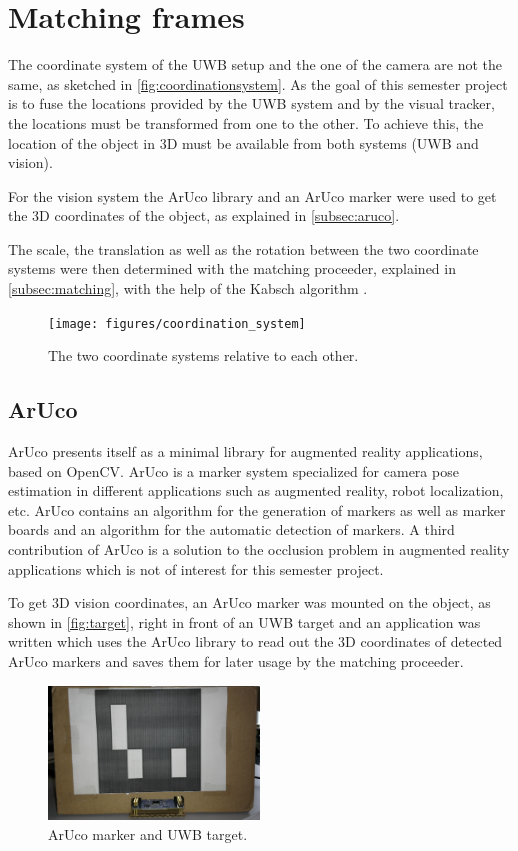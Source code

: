 \section{Matching frames}
The coordinate system of the \ac{UWB} setup and the one of the camera are not the same, as sketched in \autoref{fig:coordinationsystem}. As the goal of this semester project is to fuse the locations provided by the \ac{UWB} system and by the visual tracker, the locations must be transformed from one to the other. To achieve this, the location of the object in 3D must be available from both systems (\ac{UWB} and vision).

For the vision system the ArUco \cite{Aruco2014} library and an ArUco marker were used to get the 3D coordinates of the object, as explained in \autoref{subsec:aruco}.

The scale, the translation as well as the rotation between the two coordinate systems were then determined with the matching proceeder, explained in \autoref{subsec:matching}, with the help of the Kabsch algorithm \cite{Kabsch:a12999}.
\begin{figure}[ht!]\centering
	\texttt{[image: figures/coordination\_system]}
	\caption{The two coordinate systems relative to each other.}\label{fig:coordinationsystem}
\end{figure}

\subsection{ArUco}\label{subsec:aruco}
ArUco \cite{Aruco2014} presents itself as a minimal library for augmented reality applications, based on OpenCV. ArUco is a marker system specialized for camera pose estimation in different applications such as augmented reality, robot localization, etc. ArUco contains an algorithm for the generation of markers as well as marker boards and an algorithm for the automatic detection of markers. A third contribution of ArUco is a solution to the occlusion problem in augmented reality applications which is not of interest for this semester project.

To get 3D vision coordinates, an ArUco marker was mounted on the object, as shown in \autoref{fig:target}, right in front of an \ac{UWB} target and an application was written which uses the ArUco library to read out the 3D coordinates of detected ArUco markers and saves them for later usage by the matching proceeder.
\begin{figure}[ht!]\centering
	\includegraphics[width=0.5\textwidth]{figures/Box_cut.jpg}
	\caption{ArUco marker and \ac{UWB} target.}\label{fig:target}
\end{figure}

